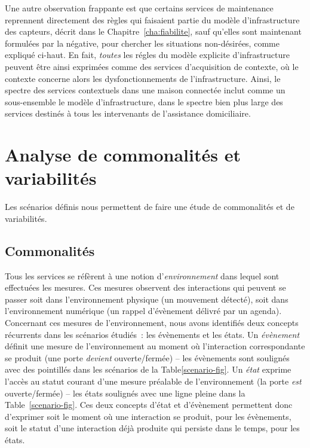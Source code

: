 Une autre observation frappante est que certains services de maintenance reprennent directement des règles
qui faisaient partie du modèle d'infrastructure des capteurs, décrit dans le Chapitre~\ref{cha:fiabilite},
sauf qu'elles sont maintenant formulées par la négative, pour chercher les situations non-désirées,
comme expliqué ci-haut. En fait, {\em toutes} les régles du modèle explicite d'infrastructure peuvent
être ainsi exprimées comme des services d'acquisition de contexte, où le contexte concerne alors
les dysfonctionnements de l'infrastructure. Ainsi, le spectre des services contextuels dans une
maison connectée inclut comme un sous-ensemble le modèle d'infrastructure, dans le spectre bien plus large 
des services destinés à tous les intervenants de l'assistance domiciliaire.

\section{Analyse de commonalités et variabilités}\label{domain:commonvar}
Les scénarios définis nous permettent de faire une étude de commonalités et de variabilités.

\subsection{Commonalités} 
Tous les services se réfèrent à une notion d'{\em environnement} dans 
lequel sont effectuées les mesures. Ces mesures observent des interactions 
qui peuvent se passer soit dans l'environnement physique (\eg un mouvement détecté), soit dans 
l'environnement numérique (\eg un rappel d'évènement délivré par un agenda). 
Concernant ces mesures de l'environnement, nous avons identifiés deux concepts 
récurrents dans les scénarios étudiés~: les évènements et les états.
Un {\em évènement} définit une mesure de l'environnement au moment où 
l'interaction correspondante se produit (\eg une porte {\em devient} ouverte/fermée) -- les 
évènements sont soulignés avec des pointillés dans les scénarios de la Table\ref{scenario-fig}.
Un {\em état} exprime l'accès au statut courant d'une mesure préalable de l'environnement
(\eg la porte 
{\em est} ouverte/fermée) -- les états soulignés avec une ligne pleine dans 
la Table~\ref{scenario-fig}.
Ces deux concepts d'état et d'évènement permettent donc d'exprimer 
soit le moment où une interaction se produit, pour les évènements, soit
le statut d'une interaction déjà produite qui persiste dans 
le temps, pour les états.


